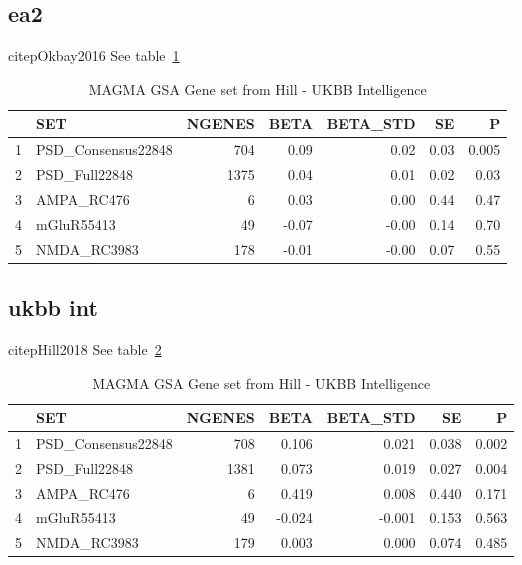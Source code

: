 \subsection{ea2}
citep{Okbay2016}
See table~\ref{table:MAGMA_GSA_HILL_SET_Okbay}
\begin{table}[ht]
\centering
\begin{tabular}{rlrrrrr}
  \hline
 & SET & NGENES & BETA & BETA\_STD & SE & P \\ 
  \hline
1 & PSD\_Consensus22848 & 704 & 0.09 & 0.02 & 0.03 & 0.005 \\ 
  2 & PSD\_Full22848 & 1375 & 0.04 & 0.01 & 0.02 & 0.03 \\ 
  3 & AMPA\_RC476 &   6 & 0.03 & 0.00 & 0.44 & 0.47 \\ 
  4 & mGluR55413 &  49 & -0.07 & -0.00 & 0.14 & 0.70 \\ 
  5 & NMDA\_RC3983 & 178 & -0.01 & -0.00 & 0.07 & 0.55 \\ 
   \hline
\end{tabular}
\caption{MAGMA GSA Gene set from Hill - UKBB Intelligence}
\label{table:MAGMA_GSA_HILL_SET_Okbay}
\end{table}

\subsection{ukbb int}
citep{Hill2018}
See table~\ref{table:MAGMA_GSA_HILL_SET_UKBBint}
\begin{table}[ht]
\centering
\begin{tabular}{rlrrrrr}
  \hline
 & SET & NGENES & BETA & BETA\_STD & SE & P \\ 
  \hline
1 & PSD\_Consensus22848 &  708 & 0.106 & 0.021 & 0.038 & 0.002 \\ 
  2 & PSD\_Full22848 & 1381 & 0.073 & 0.019 & 0.027 & 0.004 \\ 
  3 & AMPA\_RC476 &    6 & 0.419 & 0.008 & 0.440 & 0.171 \\ 
  4 & mGluR55413 &   49 & -0.024 & -0.001 & 0.153 & 0.563 \\ 
  5 & NMDA\_RC3983 &  179 & 0.003 & 0.000 & 0.074 & 0.485 \\ 
   \hline
\end{tabular}
\caption{MAGMA GSA Gene set from Hill - UKBB Intelligence}
\label{table:MAGMA_GSA_HILL_SET_UKBBint}
\end{table}


